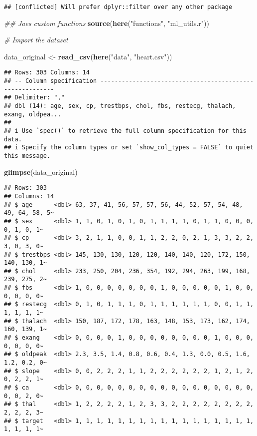 \documentclass[
]{book}
\newenvironment{Shaded}{\begin{snugshade}}{\end{snugshade}}
\newcommand{\CommentTok}[1]{\textcolor[rgb]{0.56,0.35,0.01}{\textit{#1}}}
\newcommand{\KeywordTok}[1]{\textcolor[rgb]{0.13,0.29,0.53}{\textbf{#1}}}
\newcommand{\NormalTok}[1]{#1}
\newcommand{\StringTok}[1]{\textcolor[rgb]{0.31,0.60,0.02}{#1}}
\begin{document}
\begin{verbatim}
## [conflicted] Will prefer dplyr::filter over any other package
\end{verbatim}

\begin{Shaded}
\begin{Highlighting}[]
\CommentTok{\#\# Jae\textquotesingle{}s custom functions}
\KeywordTok{source}\NormalTok{(}\KeywordTok{here}\NormalTok{(}\StringTok{"functions"}\NormalTok{, }\StringTok{"ml\_utils.r"}\NormalTok{))}

\CommentTok{\# Import the dataset}

\NormalTok{data\_original \textless{}{-}}\StringTok{ }\KeywordTok{read\_csv}\NormalTok{(}\KeywordTok{here}\NormalTok{(}\StringTok{"data"}\NormalTok{, }\StringTok{"heart.csv"}\NormalTok{))}
\end{Highlighting}
\end{Shaded}

\begin{verbatim}
## Rows: 303 Columns: 14
## -- Column specification ---------------------------------------------------------
## Delimiter: ","
## dbl (14): age, sex, cp, trestbps, chol, fbs, restecg, thalach, exang, oldpea...
## 
## i Use `spec()` to retrieve the full column specification for this data.
## i Specify the column types or set `show_col_types = FALSE` to quiet this message.
\end{verbatim}

\begin{Shaded}
\begin{Highlighting}[]
\KeywordTok{glimpse}\NormalTok{(data\_original)}
\end{Highlighting}
\end{Shaded}

\begin{verbatim}
## Rows: 303
## Columns: 14
## $ age      <dbl> 63, 37, 41, 56, 57, 57, 56, 44, 52, 57, 54, 48, 49, 64, 58, 5~
## $ sex      <dbl> 1, 1, 0, 1, 0, 1, 0, 1, 1, 1, 1, 0, 1, 1, 0, 0, 0, 0, 1, 0, 1~
## $ cp       <dbl> 3, 2, 1, 1, 0, 0, 1, 1, 2, 2, 0, 2, 1, 3, 3, 2, 2, 3, 0, 3, 0~
## $ trestbps <dbl> 145, 130, 130, 120, 120, 140, 140, 120, 172, 150, 140, 130, 1~
## $ chol     <dbl> 233, 250, 204, 236, 354, 192, 294, 263, 199, 168, 239, 275, 2~
## $ fbs      <dbl> 1, 0, 0, 0, 0, 0, 0, 0, 1, 0, 0, 0, 0, 0, 1, 0, 0, 0, 0, 0, 0~
## $ restecg  <dbl> 0, 1, 0, 1, 1, 1, 0, 1, 1, 1, 1, 1, 1, 0, 0, 1, 1, 1, 1, 1, 1~
## $ thalach  <dbl> 150, 187, 172, 178, 163, 148, 153, 173, 162, 174, 160, 139, 1~
## $ exang    <dbl> 0, 0, 0, 0, 1, 0, 0, 0, 0, 0, 0, 0, 0, 1, 0, 0, 0, 0, 0, 0, 0~
## $ oldpeak  <dbl> 2.3, 3.5, 1.4, 0.8, 0.6, 0.4, 1.3, 0.0, 0.5, 1.6, 1.2, 0.2, 0~
## $ slope    <dbl> 0, 0, 2, 2, 2, 1, 1, 2, 2, 2, 2, 2, 2, 1, 2, 1, 2, 0, 2, 2, 1~
## $ ca       <dbl> 0, 0, 0, 0, 0, 0, 0, 0, 0, 0, 0, 0, 0, 0, 0, 0, 0, 0, 0, 2, 0~
## $ thal     <dbl> 1, 2, 2, 2, 2, 1, 2, 3, 3, 2, 2, 2, 2, 2, 2, 2, 2, 2, 2, 2, 3~
## $ target   <dbl> 1, 1, 1, 1, 1, 1, 1, 1, 1, 1, 1, 1, 1, 1, 1, 1, 1, 1, 1, 1, 1~
\end{verbatim}
\end{document}
